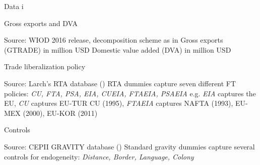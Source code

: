 \documentclass[10pt]{beamer}
\begin{document}
\begin{frame}{Data i}
    \begin{alertblock}{Gross exports and DVA}
      \begin{outline}
    \1 Source: WIOD 2016 release, decomposition scheme as in \cite{borin2019measuring}
          \2 Gross exports (GTRADE) in million USD
          \2 Domestic value added (DVA) in million USD
      \end{outline}
    \end{alertblock}
      
    \begin{block}{Trade liberalization policy}
       \begin{outline}
          \1 Source: Larch's RTA database (\cite{egger2008interdependent})
           \2 RTA dummies capture seven different FT policies: 
           \textit{CU, FTA, PSA, EIA, CUEIA, FTAEIA, PSAEIA}
           \3 e.g. \textit{EIA} captures the EU, \textit{CU} captures EU-TUR CU (1995), \textit{FTAEIA} captures NAFTA (1993), EU-MEX (2000), EU-KOR (2011)
      \end{outline}
    \end{block}
      
    \begin{exampleblock}{Controls}
    \begin{outline}
          \1 Source: CEPII GRAVITY database (\cite{conte2022cepii})
          \2 Standard gravity dummies capture several controls for endogeneity: \textit{Distance, Border, Language, Colony}
      \end{outline}
    \end{exampleblock}
\end{frame}
\end{document}
